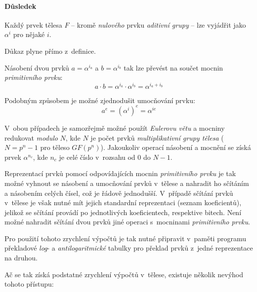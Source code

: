 \documentclass[thesis=M,czech,hidelinks]{FITthesis}[2012/06/26]
\newcommand{\0}{{\textcolor[gray]{0.80}{0}}}
\begin{document}
\paragraph{Důsledek} Každý prvek tělesa $F$ -- kromě \emph{nulového} prvku
\emph{aditivní grupy} -- lze vyjádřit jako $\alpha^i$ pro nějaké $i$.

Důkaz plyne přímo z~definice.

Násobení dvou prvků $a = \alpha^{i_a}$ a $b = \alpha^{i_b}$ tak lze převést na
součet mocnin \emph{primitivního prvku}:
$$ a \cdot b = \alpha^{i_a} \cdot \alpha^{i_b} = \alpha^{i_a + i_b} $$

Podobným způsobem je možné zjednodušit umocňování prvku:
$$ a^e = \left(\alpha^i\right)^e = \alpha^{i e} $$

V~obou případech je samozřejmě možné použít \emph{Eulerovu větu} a mocniny
redukovat \emph{modulo} $N$, kde $N$ je počet prvků \emph{multiplikativní grupy
tělesa} ($N=p^n-1$ pro těleso $GF(p^n)$). Jakoukoliv operací násobení a mocnění
se získá prvek $\alpha^{n_c}$, kde $n_c$ je celé číslo v~rozsahu od $0$ do
$N-1$.

Reprezentací prvků pomocí odpovídajících mocnin \emph{primitivního prvku} je tak
možné vyhnout se násobení a umocňování prvků v~tělese a nahradit ho sčítáním a
násobením celých čísel, což je řádově jednodušší. V~případě sčítání prvků
v~tělese je však nutné mít jejich standardní reprezentaci (seznam koeficientů),
jelikož se sčítání provádí po jednotlivých koeficientech, respektive bitech.
Není možné nahradit sčítání dvou prvků jiné operaci s~mocninami
\emph{primitivního prvku}.

Pro použití tohoto zrychlení výpočtů je tak nutné připravit v~paměti programu
překladové \emph{log}- a \emph{antilogaritmické} tabulky pro překlad prvků
z~jedné reprezentace na druhou.

Ač se tak získá podstatné zrychlení výpočtů v~tělese, existuje několik nevýhod
tohoto přístupu:
\end{document}
